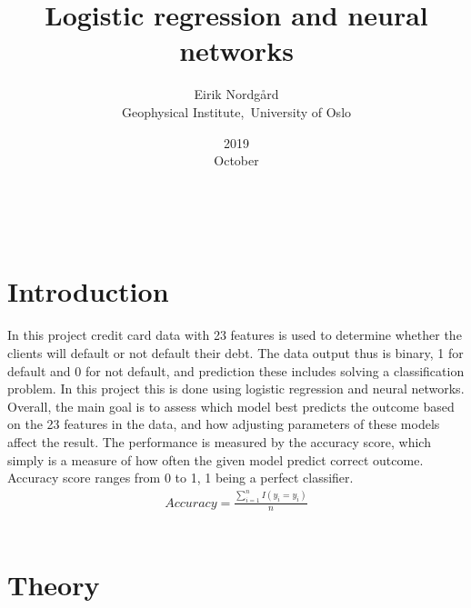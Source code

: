 \documentclass[a4paper,11pt,twocolumn]{article}
\begin{document}
\title{Logistic regression and neural networks}
\date{2019\\ October}
\author{Eirik Nordgård\\ Geophysical Institute,\ University of Oslo}


\

\section{Introduction}

In this project credit card data with 23 features is used to determine whether the clients will default or not default their debt. The data output thus is binary, 1 for default and 0 for not default, and prediction these includes solving a classification problem. In this project this is done using logistic regression and neural networks. Overall, the main goal is to assess which model best predicts the outcome based on the 23 features in the data, and how adjusting parameters of these models affect the result. The performance is measured by the accuracy score, which simply is a measure of how often the given model predict correct outcome. Accuracy score ranges from 0 to 1, 1 being a perfect classifier.    
\begin{gather*}
Accuracy = \frac{\sum\limits_{i=1}^n I(y_i = y_i)}{n}
\end{gather*}
\
\section{Theory}
\end{document}
